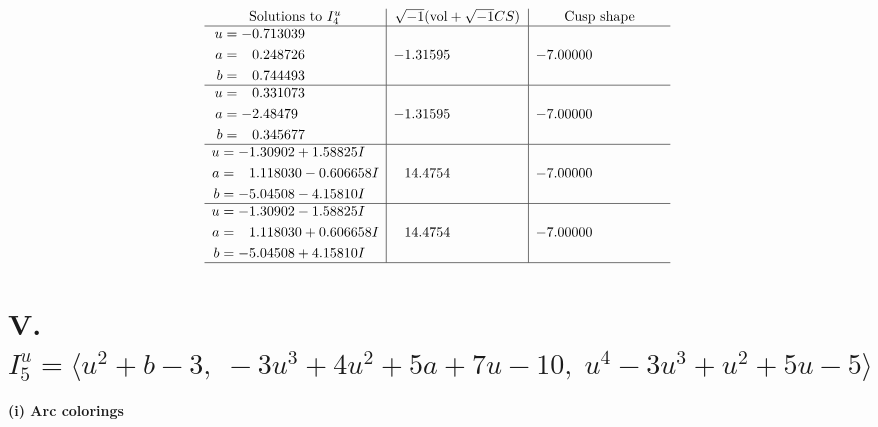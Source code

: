 \documentclass[1p]{elsarticle_modified}
\theoremstyle{definition}
\newcommand{\I}{\sqrt{-1}}
\begin{document}
$$\begin{array}{c|c|c}  
\text{Solutions to }I^u_{4}& \I (\text{vol} + \sqrt{-1}CS) & \text{Cusp shape}\\
 \hline 
\begin{aligned}
u &= -0.713039\phantom{ +0.000000I} \\
a &= \phantom{-}0.248726\phantom{ +0.000000I} \\
b &= \phantom{-}0.744493\phantom{ +0.000000I}\end{aligned}
 & -1.31595\phantom{ +0.000000I} & -7.00000\phantom{ +0.000000I} \\ \hline\begin{aligned}
u &= \phantom{-}0.331073\phantom{ +0.000000I} \\
a &= -2.48479\phantom{ +0.000000I} \\
b &= \phantom{-}0.345677\phantom{ +0.000000I}\end{aligned}
 & -1.31595\phantom{ +0.000000I} & -7.00000\phantom{ +0.000000I} \\ \hline\begin{aligned}
u &= -1.30902 + 1.58825 I \\
a &= \phantom{-}1.118030 - 0.606658 I \\
b &= -5.04508 - 4.15810 I\end{aligned}
 & \phantom{-}14.4754\phantom{ +0.000000I} & -7.00000\phantom{ +0.000000I} \\ \hline\begin{aligned}
u &= -1.30902 - 1.58825 I \\
a &= \phantom{-}1.118030 + 0.606658 I \\
b &= -5.04508 + 4.15810 I\end{aligned}
 & \phantom{-}14.4754\phantom{ +0.000000I} & -7.00000\phantom{ +0.000000I}\\
 \hline 
 \end{array}$$\newpage\newpage\renewcommand{\arraystretch}{1}
\centering \section*{V. $I^u_{5}= \langle u^2+b-3,\;-3 u^3+4 u^2+5 a+7 u-10,\;u^4-3 u^3+u^2+5 u-5 \rangle$}
\flushleft \textbf{(i) Arc colorings}\\
\end{document}
